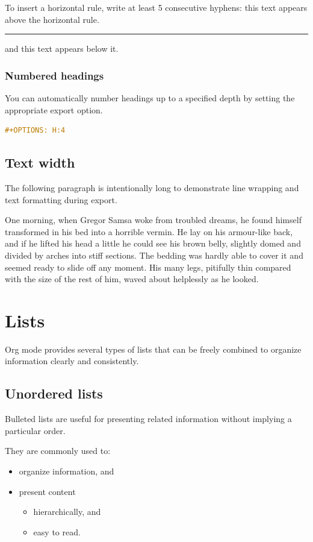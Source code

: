 \documentclass{mcreport}
\begin{document}
To insert a horizontal rule, write at least 5 consecutive hyphens: this text
appears above the horizontal rule.

\noindent\rule{\textwidth}{0.5pt}
and this text appears below it.
\subsubsection{Numbered headings}
\label{sec:org74ae2a4}

You can automatically number headings up to a specified depth by setting the
appropriate export option.

\begin{lstlisting}[language=org,numbers=none]
#+OPTIONS: H:4
\end{lstlisting}
\subsection{Text width}
\label{sec:org0fe24ac}

The following paragraph is intentionally long to demonstrate line wrapping and
text formatting during export.

One morning, when Gregor Samsa woke from troubled dreams, he found himself
transformed in his bed into a horrible vermin. He lay on his armour-like back,
and if he lifted his head a little he could see his brown belly, slightly domed
and divided by arches into stiff sections. The bedding was hardly able to cover
it and seemed ready to slide off any moment. His many legs, pitifully thin
compared with the size of the rest of him, waved about helplessly as he looked.
\section{Lists}
\label{sec:org68e2f2e}

Org mode provides several types of lists that can be freely combined to organize
information clearly and consistently.
\subsection{Unordered lists}
\label{sec:org1b528f7}

Bulleted lists are useful for presenting related information without implying
a particular order.

They are commonly used to:

\begin{itemize}
\item organize information, and
\item present content
\begin{itemize}
\item hierarchically, and
\item easy to read.
\end{itemize}
\end{itemize}
\end{document}
